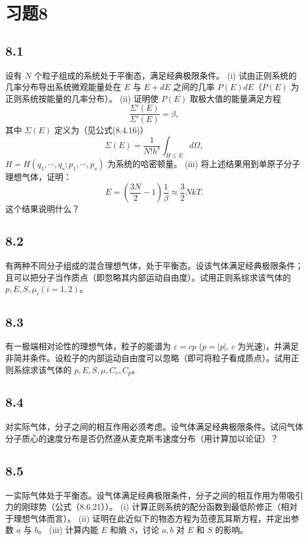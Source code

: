 \section{习题8}

\newpage
\subsection{8.1}
设有 $N$ 个粒子组成的系统处于平衡态，满足经典极限条件。
(i) 试由正则系统的几率分布导出系统微观能量处在 $E$ 与 $E + dE$ 之间的几率 $P(E)dE$（$P(E)$ 为正则系统按能量的几率分布）。
(ii) 证明使 $P(E)$ 取极大值的能量满足方程
$$\frac{\Sigma'(E)}{\Sigma'(E)} = \beta,$$
其中 $\Sigma(E)$ 定义为（见公式(8.4.16)）
$$\Sigma(E) = \frac{1}{N!h^s} \int_{H \leq E} d\Omega,$$
$H = H(q_1, \cdots, q_s; p_1, \cdots, p_s)$ 为系统的哈密顿量。
(iii) 将上述结果用到单原子分子理想气体，证明：
$$E = \left( \frac{3N}{2} - 1 \right) \frac{1}{\beta} \approx \frac{3}{2} NkT.$$
这个结果说明什么？

\newpage
\subsection{8.2}
有两种不同分子组成的混合理想气体，处于平衡态。设该气体满足经典极限条件；且可以把分子当作质点（即忽略其内部运动自由度）。试用正则系综求该气体的 $p, E, S, \mu_i (i=1,2)$。

\newpage
\subsection{8.3}
有一极端相对论性的理想气体，粒子的能谱为 $\varepsilon = cp$ ($p = |p|$, $c$ 为光速)，并满足非简并条件。设粒子的内部运动自由度可以忽略（即可将粒子看成质点）。试用正则系综求该气体的 $p, E, S, \mu, C_v, C_p$。

\newpage
\subsection{8.4}
对实际气体，分子之间的相互作用必须考虑。设气体满足经典极限条件。试问气体分子质心的速度分布是否仍然遵从麦克斯韦速度分布（用计算加以论证）？

\newpage
\subsection{8.5}
一实际气体处于平衡态。设气体满足经典极限条件，分子之间的相互作用为带吸引力的刚球势（公式（8.6.21））。
(i) 计算正则系统的配分函数到最低阶修正（相对于理想气体而言）。
(ii) 证明在此近似下的物态方程为范德瓦耳斯方程，并定出参数 $a$ 与 $b$。
(iii) 计算内能 $E$ 和熵 $S$，讨论 $a,b$ 对 $E$ 和 $S$ 的影响。

